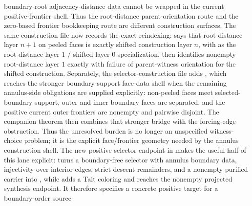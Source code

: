 \documentclass[11pt]{article}
\begin{document}
\begin{itemize}
boundary-root adjacency-distance data cannot be wrapped in the current
positive-frontier shell.  Thus the root-distance parent-orientation route and
the zero-based frontier bookkeeping route are different construction surfaces.
The same construction file now records the exact reindexing:
says that root-distance layer \(n+1\) on peeled faces is exactly shifted
construction layer \(n\), with
as the root-distance layer \(1\) / shifted layer \(0\) specialization.
then identifies nonempty root-distance layer \(1\) exactly with failure of
parent-witness orientation for the shifted construction.
Separately, the selector-construction file adds
,
which reaches the stronger boundary-support face-data shell when the remaining
annulus-side obligations are supplied explicitly: non-peeled faces meet
selected-boundary support, outer and inner boundary faces are separated, and the
positive current outer frontiers are nonempty and pairwise disjoint.  The
companion theorem
then combines that stronger bridge with the forcing-edge obstruction.  Thus the
unresolved burden is no longer an unspecified witness-choice problem; it is the
explicit face/frontier geometry needed by the annulus construction shell.  The
new positive selector endpoint in
 makes the useful half of
this lane explicit:
turns a boundary-free selector with annulus boundary data, injectivity over
interior edges, strict-descent remainders, and a nonempty purified carrier into
, while
adds a Tait coloring and reaches the nonempty projected synthesis endpoint.  It
therefore specifies a concrete positive target for a boundary-order source

\end{itemize}
\end{document}
